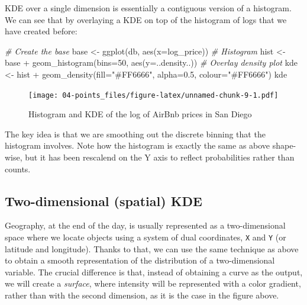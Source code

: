 \documentclass[
]{book}
\newenvironment{Shaded}{\begin{snugshade}}{\end{snugshade}}
\newcommand{\AttributeTok}[1]{\textcolor[rgb]{0.77,0.63,0.00}{#1}}
\newcommand{\CommentTok}[1]{\textcolor[rgb]{0.56,0.35,0.01}{\textit{#1}}}
\newcommand{\DecValTok}[1]{\textcolor[rgb]{0.00,0.00,0.81}{#1}}
\newcommand{\FloatTok}[1]{\textcolor[rgb]{0.00,0.00,0.81}{#1}}
\newcommand{\FunctionTok}[1]{\textcolor[rgb]{0.00,0.00,0.00}{#1}}
\newcommand{\NormalTok}[1]{#1}
\newcommand{\OtherTok}[1]{\textcolor[rgb]{0.56,0.35,0.01}{#1}}
\newcommand{\SpecialCharTok}[1]{\textcolor[rgb]{0.00,0.00,0.00}{#1}}
\newcommand{\StringTok}[1]{\textcolor[rgb]{0.31,0.60,0.02}{#1}}
\begin{document}
KDE over a single dimension is essentially a contiguous version of a histogram. We can see that by overlaying a KDE on top of the histogram of logs that we have created before:

\begin{Shaded}
\begin{Highlighting}[]
\CommentTok{\# Create the base}
\NormalTok{base }\OtherTok{\textless{}{-}} \FunctionTok{ggplot}\NormalTok{(db, }\FunctionTok{aes}\NormalTok{(}\AttributeTok{x=}\NormalTok{log\_price))}
\CommentTok{\# Histogram}
\NormalTok{hist }\OtherTok{\textless{}{-}}\NormalTok{ base }\SpecialCharTok{+} 
  \FunctionTok{geom\_histogram}\NormalTok{(}\AttributeTok{bins=}\DecValTok{50}\NormalTok{, }\FunctionTok{aes}\NormalTok{(}\AttributeTok{y=}\NormalTok{..density..))}
\CommentTok{\# Overlay density plot}
\NormalTok{kde }\OtherTok{\textless{}{-}}\NormalTok{ hist }\SpecialCharTok{+} 
  \FunctionTok{geom\_density}\NormalTok{(}\AttributeTok{fill=}\StringTok{"\#FF6666"}\NormalTok{, }\AttributeTok{alpha=}\FloatTok{0.5}\NormalTok{, }\AttributeTok{colour=}\StringTok{"\#FF6666"}\NormalTok{)}
\NormalTok{kde}
\end{Highlighting}
\end{Shaded}

\begin{figure}
\centering
\texttt{[image: 04-points\_files/figure-latex/unnamed-chunk-9-1.pdf]}
\caption{\label{fig:unnamed-chunk-9}Histogram and KDE of the log of AirBnb prices in San Diego}
\end{figure}

The key idea is that we are smoothing out the discrete binning that the histogram involves. Note how the histogram is exactly the same as above shape-wise, but it has been rescalend on the Y axis to reflect probabilities rather than counts.

\hypertarget{two-dimensional-spatial-kde}{%
\subsection{Two-dimensional (spatial) KDE}\label{two-dimensional-spatial-kde}}

Geography, at the end of the day, is usually represented as a two-dimensional space where we locate objects using a system of dual coordinates, \texttt{X} and \texttt{Y} (or latitude and longitude). Thanks to that, we can use the same technique as above to obtain a smooth representation of the distribution of a two-dimensional variable. The crucial difference is that, instead of obtaining a curve as the output, we will create a \emph{surface}, where intensity will be represented with a color gradient, rather than with the second dimension, as it is the case in the figure above.
\end{document}
